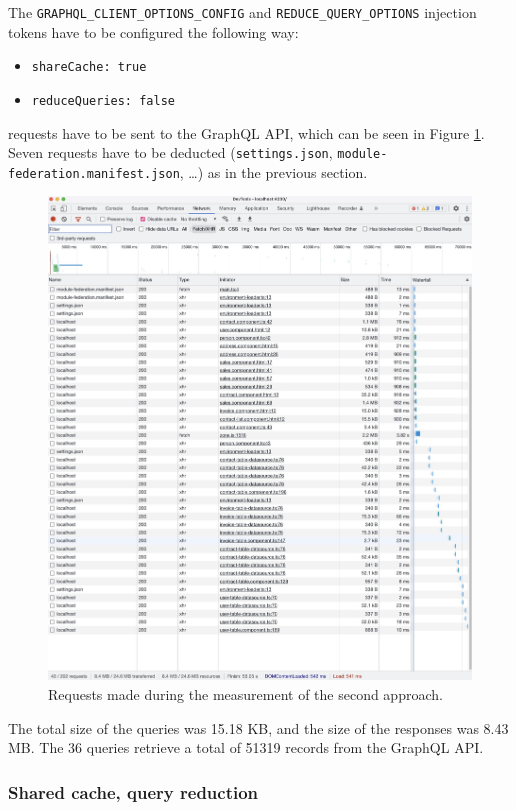 \noindent The \texttt{GRAPHQL\_CLIENT\_OPTIONS\_CONFIG} and \texttt{REDUCE\_QUERY\_OPTIONS} injection tokens have to be configured the following way:

\begin{itemize}
  \item \texttt{shareCache: true}
  \item \texttt{reduceQueries: false}
\end{itemize}

 requests have to be sent to the GraphQL \ac{API}, which can be seen in Figure \ref{fig:results:shared-cache-no-reduction}. Seven requests have to be deducted (\texttt{settings.json}, \texttt{module-federation.manifest.json}, \dots) as in the previous section.

\ifshowImages
\begin{figure}[H]
  \centering
  \includegraphics[width=0.8\linewidth]{images/results/1-attempt/shared-not-reduced-cache.jpg}
  \caption{Requests made during the measurement of the second approach.}\label{fig:results:shared-cache-no-reduction}
\end{figure}
\fi

\noindent The total size of the queries was 15.18 KB, and the size of the responses was 8.43 MB. The 36 queries retrieve a total of 51319 records from the GraphQL \ac{API}.

\subsubsection{Shared cache, query reduction}\label{subsubsection:results:performance-measurement:separate-cache-reduction}

